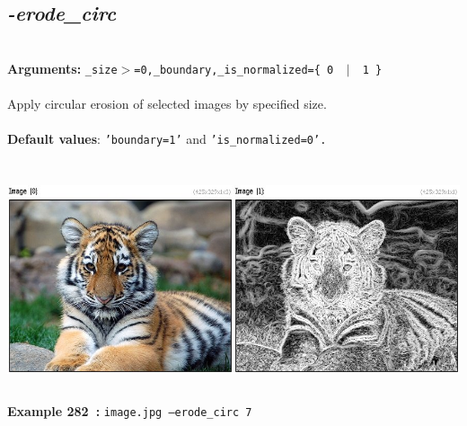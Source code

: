 \documentclass[a4paper,11pt,twoside]{book}
\begin{document}
\subsection{\emph{-erode\_circ} }\vspace*{-0.5em}
~\\\textbf{Arguments: } 
{\small \texttt{\_size$>$=0,\_boundary,\_is\_normalized=\{ 0 ~$|$~ 1 \}}}\\~\\
Apply circular erosion of selected images by specified size.
~\\~\\\textbf{Default values}: {\small \texttt{'boundary=1'} and \texttt{'is\_normalized=0'.}}
\begin{center}\includegraphics[keepaspectratio=true,height=7cm,width=\textwidth]{img/gmic_def282.jpg}\\
{\footnotesize \textbf{Example 282~:} \texttt{image.jpg --erode\_circ 7}}
\end{center}
\end{document}
